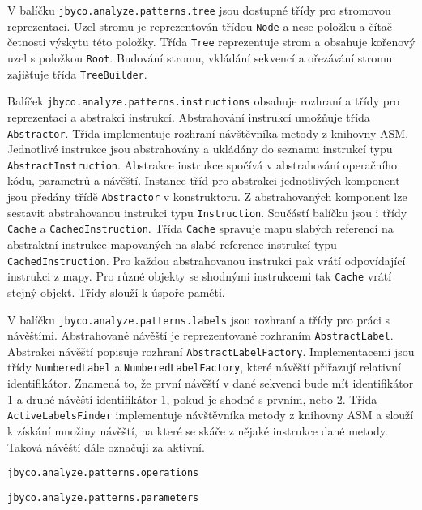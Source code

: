 V balíčku \texttt{jbyco.analyze.patterns.tree} jsou dostupné třídy pro stromovou reprezentaci. Uzel stromu je reprezentován třídou \texttt{Node} a nese položku a čítač četnosti výskytu této položky. Třída \texttt{Tree} reprezentuje strom a obsahuje kořenový uzel s položkou \texttt{Root}. Budování stromu, vkládání sekvencí a ořezávání stromu zajišťuje třída \texttt{TreeBuilder}. 

Balíček \texttt{jbyco.analyze.patterns.instructions} obsahuje rozhraní a třídy pro reprezentaci a abstrakci instrukcí. Abstrahování instrukcí umožňuje třída \texttt{Abstractor}. Třída implementuje rozhraní návštěvníka metody z knihovny ASM. Jednotlivé instrukce jsou abstrahovány a ukládány do seznamu instrukcí typu \texttt{AbstractInstruction}. Abstrakce instrukce spočívá v abstrahování operačního kódu, parametrů a návěští. Instance tříd pro abstrakci jednotlivých komponent jsou předány třídě \texttt{Abstractor} v konstruktoru. Z abstrahovaných komponent lze sestavit abstrahovanou instrukci typu \texttt{Instruction}. Součástí balíčku jsou i třídy \texttt{Cache} a \texttt{CachedInstruction}. Třída \texttt{Cache} spravuje mapu slabých referencí na abstraktní instrukce mapovaných na slabé reference instrukcí typu \texttt{CachedInstruction}. Pro každou abstrahovanou instrukci pak vrátí odpovídající instrukci z mapy. Pro různé objekty se shodnými instrukcemi tak \texttt{Cache} vrátí stejný objekt. Třídy slouží k úspoře paměti.

V balíčku \texttt{jbyco.analyze.patterns.labels} jsou rozhraní a třídy pro práci s návěštími. Abstrahované návěští je reprezentované rozhraním \texttt{AbstractLabel}. Abstrakci návěští popisuje rozhraní \texttt{AbstractLabelFactory}. Implementacemi jsou třídy \texttt{NumberedLabel} a \texttt{NumberedLabelFactory}, které návěští přiřazují relativní identifikátor. Znamená to, že první návěští v dané sekvenci bude mít identifikátor 1 a druhé návěští identifikátor 1, pokud je shodné s prvním, nebo 2. Třída \texttt{ActiveLabelsFinder} implementuje návštěvníka metody z knihovny ASM a slouží k získání množiny návěští, na které se skáče z nějaké instrukce dané metody. Taková návěští dále označuji za aktivní.

\texttt{jbyco.analyze.patterns.operations}

\texttt{jbyco.analyze.patterns.parameters}


